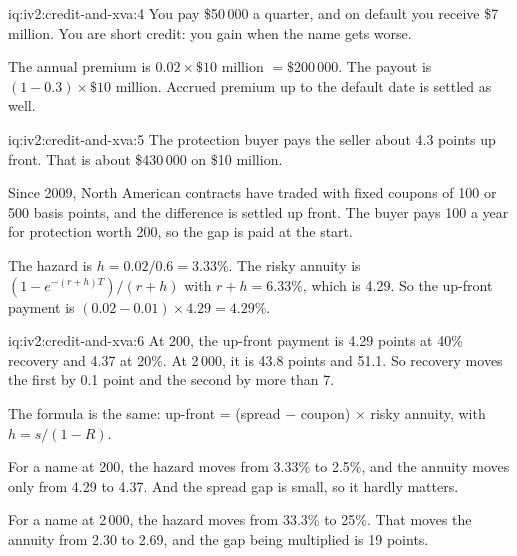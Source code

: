 \begin{solution}{iq:iv2:credit-and-xva:4}
You pay \$50\,000 a quarter, and on default you receive \$7 million. You are short credit: you gain when the name gets worse.

The annual premium is $0.02 \times \$10$ million $= \$200\,000$. The payout is $(1 - 0.3) \times \$10$ million. Accrued premium up to the default date is settled as well.

\end{solution}

\begin{solution}{iq:iv2:credit-and-xva:5}
The protection buyer pays the seller about 4.3 points up front. That is about \$430\,000 on \$10 million.

Since 2009, North American contracts have traded with fixed coupons of 100 or 500 basis points, and the difference is settled up front. The buyer pays 100 a year for protection worth 200, so the gap is paid at the start.

The hazard is $h = 0.02/0.6 = 3.33\%$. The risky annuity is $(1 - e^{-(r + h)T})/(r + h)$ with $r + h = 6.33\%$, which is 4.29. So the up-front payment is $(0.02 - 0.01) \times 4.29 = 4.29\%$.

\end{solution}

\begin{solution}{iq:iv2:credit-and-xva:6}
At 200, the up-front payment is 4.29 points at 40\% recovery and 4.37 at 20\%. At 2\,000, it is 43.8 points and 51.1. So recovery moves the first by 0.1 point and the second by more than 7.

The formula is the same: up-front = (spread $-$ coupon) $\times$ risky annuity, with $h = s/(1 - R)$.

For a name at 200, the hazard moves from 3.33\% to 2.5\%, and the annuity moves only from 4.29 to 4.37. And the spread gap is small, so it hardly matters.

For a name at 2\,000, the hazard moves from 33.3\% to 25\%. That moves the annuity from 2.30 to 2.69, and the gap being multiplied is 19 points.

\end{solution}

